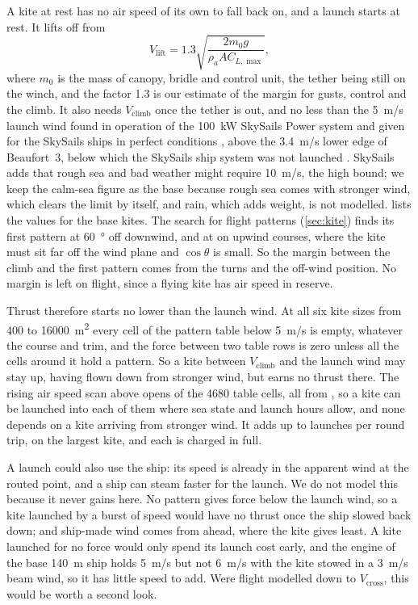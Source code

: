 A kite at rest has no air speed of its own to fall back on, and a launch starts at rest. It lifts off from
\begin{equation}
V_\mathrm{lift} = 1.3\sqrt{\frac{2m_0 g}{\rho_a A C_{L,\max}}},
\label{eq:lift_off}
\end{equation}
where $m_0$ is the mass of canopy, bridle and control unit, the tether being still on the winch, and the factor 1.3 is our estimate of the margin for gusts, control and the climb. It also needs $V_\mathrm{climb}$ once the tether is out, and no less than the \SI{5}{m/s} launch wind found in operation of the \SI{100}{kW} SkySails Power system \citep{skypower100_tib} and given for the SkySails ships in perfect conditions \citep{paulig2013}, above the \SI{3.4}{m/s} lower edge of Beaufort~3, below which the SkySails ship system was not launched \citep{noaa2009}. SkySails adds that rough sea and bad weather might require \SI{10}{m/s}, the high bound; we keep the calm-sea figure as the base because rough sea comes with stronger wind, which clears the limit by itself, and rain, which adds weight, is not modelled.  lists the values for the base kites.
The search for flight patterns (\cref{sec:kite}) finds its first pattern at  \SI{60}{\degree} off downwind, and at  on upwind courses, where the kite must sit far off the wind plane and $\cos\theta$ is small. So the margin between the climb and the first pattern comes from the turns and the off-wind position. No margin is left on flight, since a flying kite has air speed in reserve.

Thrust therefore starts no lower than the launch wind. At all six kite sizes from 400 to \SI{16000}{m^2} every cell of the pattern table below \SI{5}{m/s} is empty, whatever the course and trim, and the force between two table rows is zero unless all the cells around it hold a pattern. So a kite between $V_\mathrm{climb}$ and the launch wind may stay up, having flown down from stronger wind, but earns no thrust there. The rising air speed scan above opens  of the \num{4680} table cells, all from , so a kite can be launched into each of them where sea state and launch hours allow, and none depends on a kite arriving from stronger wind. It adds up to  launches per round trip, on the largest kite, and each is charged in full.

A launch could also use the ship: its speed is already in the apparent wind at the routed point, and a ship can steam faster for the launch. We do not model this because it never gains here. No pattern gives force below the launch wind, so a kite launched by a burst of speed would have no thrust once the ship slowed back down; and ship-made wind comes from ahead, where the kite gives least. A kite launched for no force would only spend its launch cost early, and the engine of the base \SI{140}{m} ship holds \SI{5}{m/s} but not \SI{6}{m/s} with the kite stowed in a \SI{3}{m/s} beam wind, so it has little speed to add. Were flight modelled down to $V_\mathrm{cross}$, this would be worth a second look.

